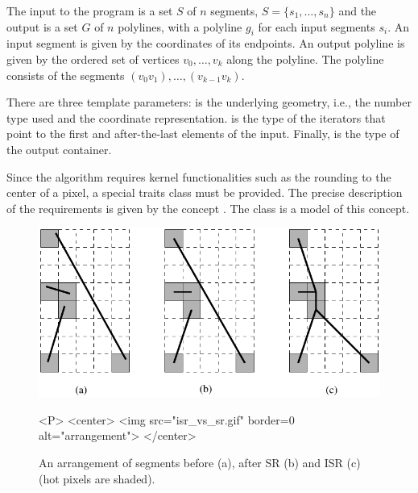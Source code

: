 The input to the program is a set $S$ of $n$ segments,
$S=\{s_1,\ldots,s_n\}$ and the output is a set $G$ of $n$ polylines,
with a polyline $g_i$ for each input segments $s_i$. An input segment
is given by the coordinates of its endpoints. An output polyline is
given by the ordered set of vertices $v_0,\ldots,v_k$ along the polyline.
The polyline consists of the segments
$(v_0v_1),\ldots,(v_{k-1}v_k)$.

There are three template parameters:  is the underlying geometry,
i.e., the number type used and the coordinate representation.
 is the type of the iterators that point to the first
and after-the-last elements of the input. Finally,  is the
type of the output container.

Since the algorithm requires kernel functionalities such as the rounding to the
center of a pixel, a special traits class must be provided. The precise
description of the requirements is given by the concept
. The class  is a model of
this concept.

\begin{figure}
\begin{ccTexOnly}
\centerline{\includegraphics{Snap_rounding_2/isr_vs_sr}}
\end{ccTexOnly}

\caption{An arrangement of segments before (a), after SR (b)
and ISR (c) (hot pixels are shaded).}
\label{fig:isr_vs_sr}

\begin{ccHtmlOnly}
<P>
<center>
  <img src="isr_vs_sr.gif"  border=0 alt="arrangement">
</center>
\end{ccHtmlOnly}
\end{figure}


